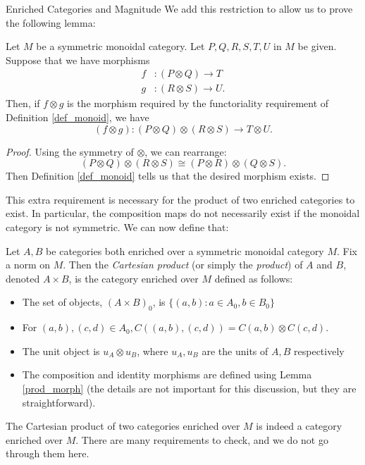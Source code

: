 \documentclass[12pt]{pom_thesis}
\begin{document}
\begin{chapter}{Enriched Categories and Magnitude}
We add this restriction to allow us to prove the following lemma:

\begin{lemma}
Let $M$ be a symmetric monoidal category. Let $P,Q,R,S,T,U$ in $M$ be given. Suppose that we have morphisms
\begin{align*}
f&:(P \otimes Q) \rightarrow T\\
g&:(R \otimes S) \rightarrow U.
\end{align*}
Then, if $f \otimes g$ is the morphism required by the functoriality requirement of Definition \ref{def_monoid}, we have
\[
(f \otimes g):(P \otimes Q) \otimes (R \otimes S) \rightarrow T \otimes U.
\]
\end{lemma}
\begin{proof}\label{prod_morph}
Using the symmetry of $\otimes$, we can rearrange:
\[
(P \otimes Q) \otimes (R \otimes S) \cong (P \otimes R) \otimes (Q \otimes S).
\]
Then Definition \ref{def_monoid} tells us that the desired morphism exists.
\end{proof}
This extra requirement is necessary for the product of two enriched categories to exist. In particular, the composition maps do not necessarily exist if the monoidal category is not symmetric. We can now define that:

\begin{defn}

Let $A,B$ be categories both enriched over a symmetric monoidal category $M$. Fix a norm on $M$. Then the \emph{Cartesian product} (or simply the \emph{product}) of $A$ and $B$, denoted $A \times B$, is the category enriched over $M$ defined as follows:
\begin{itemize}
\item The set of objects, $(A \times B)_0$, is $\{(a,b):a \in A_0, b \in  B_0\}$
\item For $(a,b), (c,d) \in A_0, C((a,b), (c,d)) = C(a,b) \otimes C(c,d)$.
\item The unit object is $u_A \otimes u_B$, where $u_A, u_B$ are the units of $A,B$ respectively
\item The composition and identity morphisms are defined using Lemma \ref{prod_morph} (the details are not important for this discussion, but they are straightforward).
\end{itemize}
\begin{rmk}
The Cartesian product of two categories enriched over $M$ is indeed a category enriched over $M$. There are many requirements to check, and we do not go through them here.
\end{rmk}
\end{defn}


\end{chapter}
\end{document}
